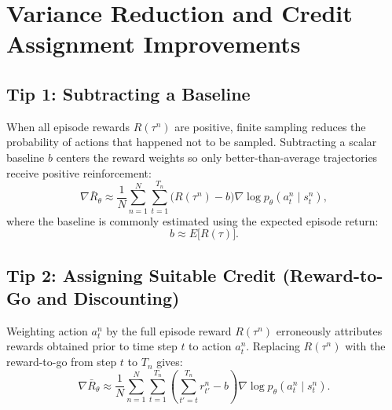 \documentclass[11pt, a4paper]{article}
\begin{document}
\section{Variance Reduction and Credit Assignment Improvements}

\subsection*{Tip 1: Subtracting a Baseline}

When all episode rewards $R(\tau^n)$ are positive, finite sampling reduces the probability of actions that happened not to be sampled. Subtracting a scalar baseline $b$ centers the reward weights so only better-than-average trajectories receive positive reinforcement:
\begin{equation}\label{eq:pg-baseline-gradient}
    \nabla \bar{R}_\theta \approx \frac{1}{N} \sum_{n=1}^{N} \sum_{t=1}^{T_n} \big(R(\tau^n) - b\big) \nabla \log p_\theta(a_t^n \mid s_t^n),
\end{equation}
where the baseline is commonly estimated using the expected episode return:
\begin{equation}\label{eq:pg-expected-return-baseline}
    b \approx E\big[R(\tau)\big].
\end{equation}

\subsection*{Tip 2: Assigning Suitable Credit (Reward-to-Go and Discounting)}

Weighting action $a_t^n$ by the full episode reward $R(\tau^n)$ erroneously attributes rewards obtained prior to time step $t$ to action $a_t^n$. Replacing $R(\tau^n)$ with the reward-to-go from step $t$ to $T_n$ gives:
\begin{equation}\label{eq:pg-reward-to-go-gradient}
    \nabla \bar{R}_\theta \approx \frac{1}{N} \sum_{n=1}^{N} \sum_{t=1}^{T_n} \left( \sum_{t'=t}^{T_n} r_{t'}^n - b \right) \nabla \log p_\theta(a_t^n \mid s_t^n).
\end{equation}
\end{document}
